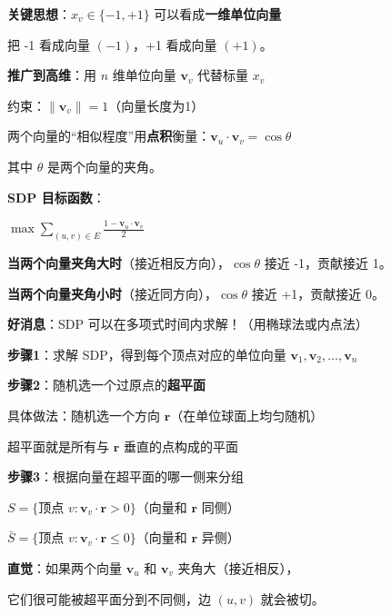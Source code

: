 \documentclass[12pt, a4paper]{ctexart}
\begin{document}
\begin{blackboard}

\textbf{关键思想}：$x_v \in \{-1, +1\}$ 可以看成\textbf{一维单位向量}

把 -1 看成向量 $(-1)$，+1 看成向量 $(+1)$。

\textbf{推广到高维}：用 $n$ 维单位向量 $\mathbf{v}_v$ 代替标量 $x_v$

约束：$\|\mathbf{v}_v\| = 1$（向量长度为1）

两个向量的``相似程度''用\textbf{点积}衡量：$\mathbf{v}_u \cdot \mathbf{v}_v = \cos\theta$

其中 $\theta$ 是两个向量的夹角。

\textbf{SDP 目标函数}：

$\max \sum_{(u,v) \in E} \frac{1 - \mathbf{v}_u \cdot \mathbf{v}_v}{2}$

\textbf{当两个向量夹角大时}（接近相反方向），$\cos\theta$ 接近 -1，贡献接近 1。

\textbf{当两个向量夹角小时}（接近同方向），$\cos\theta$ 接近 +1，贡献接近 0。

\textbf{好消息}：SDP 可以在多项式时间内求解！（用椭球法或内点法）

\end{blackboard}

\begin{blackboard}

\textbf{步骤1}：求解 SDP，得到每个顶点对应的单位向量 $\mathbf{v}_1, \mathbf{v}_2, \ldots, \mathbf{v}_n$

\textbf{步骤2}：随机选一个过原点的\textbf{超平面}

具体做法：随机选一个方向 $\mathbf{r}$（在单位球面上均匀随机）

超平面就是所有与 $\mathbf{r}$ 垂直的点构成的平面

\textbf{步骤3}：根据向量在超平面的哪一侧来分组

$S = \{\text{顶点 } v : \mathbf{v}_v \cdot \mathbf{r} > 0\}$（向量和 $\mathbf{r}$ 同侧）

$\bar{S} = \{\text{顶点 } v : \mathbf{v}_v \cdot \mathbf{r} \leq 0\}$（向量和 $\mathbf{r}$ 异侧）

\textbf{直觉}：如果两个向量 $\mathbf{v}_u$ 和 $\mathbf{v}_v$ 夹角大（接近相反），

它们很可能被超平面分到不同侧，边 $(u,v)$ 就会被切。

\end{blackboard}
\end{document}
